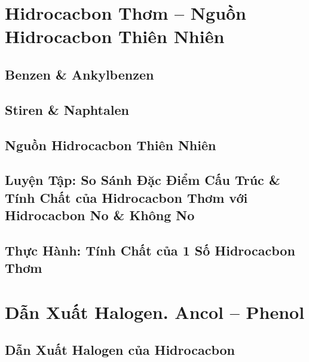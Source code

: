 \documentclass[oneside]{book}
\numberwithin{equation}{section}
\begin{document}

\chapter{Hidrocacbon Thơm -- Nguồn Hidrocacbon Thiên Nhiên}

\section{Benzen \& Ankylbenzen}


\section{Stiren \& Naphtalen}


\section{Nguồn Hidrocacbon Thiên Nhiên}


\section{Luyện Tập: So Sánh Đặc Điểm Cấu Trúc \& Tính Chất của Hidrocacbon Thơm với Hidrocacbon No \& Không No}


\section{Thực Hành: Tính Chất của 1 Số Hidrocacbon Thơm}


\chapter{Dẫn Xuất Halogen. Ancol -- Phenol}

\section{Dẫn Xuất Halogen của Hidrocacbon}
\end{document}

